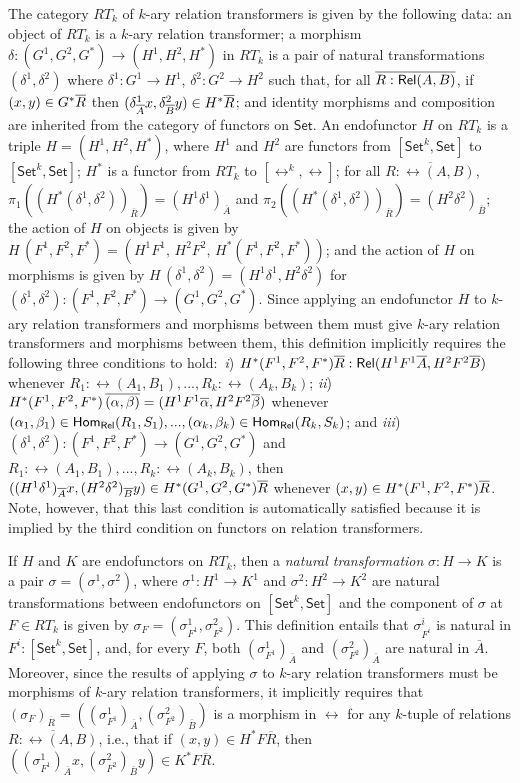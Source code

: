 \documentclass[runningheads]{llncs}
\newcommand{\set}{\mathsf{Set}}
\begin{document}
The category $RT_k$ of $k$-ary relation transformers is given by the
following data: an object of $RT_k$ is a $k$-ary relation transformer;
a morphism $\delta : (G^1,G^2,G^*) \to (H^1,H^2,H^*)$ in $RT_k$ is a
pair of natural transformations $(\delta^1, \delta^2)$ where $\delta^1
: G^1 \to H^1$, $\delta^2 : G^2 \to H^2$ such that, for all $\overline{R :
  \mathsf{Rel}(A, B)}$, if $(x, y) \in G^*\overline{R}$ then $(\delta^1_{\overline{A}}x,
\delta^2_{\overline{B}}y) \in H^*\overline{R}$; and identity morphisms and
composition are inherited from the category of functors on $\set$.  An
endofunctor $H$ on $RT_k$ is a triple $H = (H^1,H^2,H^*)$, where $H^1$
and $H^2$ are functors from $[\set^k,\set]$ to $[\set^k,\set]$; $H^*$
is a functor from $RT_k$ to $[\rel^k,\rel]$; for all $\overline{R :
  \rel(A,B)}$, $\pi_1((H^*(\delta^1,\delta^2))_{\overline{R}}) = (H^1
\delta^1)_{\overline{A}}$ and
$\pi_2((H^*(\delta^1,\delta^2))_{\overline{R}}) = (H^2
\delta^2)_{\overline{B}}$; the action of $H$ on objects is given by
$H\,(F^1,F^2,F^*) = (H^1F^1,\,H^2F^2,\,H^*(F^1,F^2,F^*))$; and the
action of $H$ on morphisms is given by $H\,(\delta^1,\delta^2) =
(H^1\delta^1,H^2\delta^2)$ for $(\delta^1,\delta^2) : (F^1,F^2,F^*)\to
(G^1,G^2,G^*)$.  Since applying an endofunctor $H$ to $k$-ary relation
transformers and morphisms between them must give $k$-ary relation
transformers and morphisms between them, this definition implicitly
requires the following three conditions to hold: \,{\em i})
$H^*(F^1,F^2,F^*) \overline{R} : \mathsf{Rel}(H^1F^1 \overline{A}, H^2F^2 \overline{B})$
whenever $R_1:\rel(A_1,B_1),...,R_k:\rel(A_k,B_k)$; {\em ii})
$H^*(F^1,F^2,F^*)\, \overline{(\alpha, \beta)} = (H^1F^1\overline{\alpha}, H^2F^2
\overline{\beta})$ whenever $(\alpha_1, \beta_1) \in \mathsf{Hom_{Rel}}(R_1,S_1),...,
(\alpha_k, \beta_k) \in \mathsf{Hom_{Rel}}(R_k,S_k)$; and {\em iii}) $(\delta^1,\delta^2) : 
(F^1,F^2,F^*)\to (G^1,G^2,G^*)$ and
$R_1:\rel(A_1,B_1),...,R_k:\rel(A_k,B_k)$, then
$((H^1\delta^1)_{\overline{A}}x, (H^2\delta^2)_{\overline{B}}y) \in
H^*(G^1,G^2,G^*)\overline{R}$ whenever $(x, y) \in
H^*(F^1,F^2,F^*)\overline{R}$. Note, however, that this last condition is
automatically satisfied because it is implied by the third condition
on functors on relation transformers.

If $H$ and $K$ are endofunctors on $RT_k$, then a {\em natural
  transformation} $\sigma : H \to K$ is a pair $\sigma = (\sigma^1,
\sigma^2)$, where $\sigma^1 : H^1 \to K^1$ and $\sigma^2 : H^2 \to
K^2$ are natural transformations between endofunctors on
$[\set^k,\set]$ and the component of $\sigma$ at $F \in RT_k$ is given
by $\sigma_F = (\sigma^1_{F^1}, \sigma^2_{F^2})$.  This definition
entails that $\sigma^i_{F^i}$ is natural in $F^i : [\set^k,\set]$,
and, for every $F$, both $(\sigma^1_{F^1})_{\overline{A}}$ and
$(\sigma^2_{F^2})_{\overline{A}}$ are natural in $\overline{A}$.
Moreover, since the results of applying $\sigma$ to $k$-ary relation
transformers must be morphisms of $k$-ary relation transformers, it
implicitly requires that $(\sigma_F)_{\overline{R}} = (
(\sigma^1_{F^1})_{\overline{A}}, (\sigma^2_{F^2})_{\overline{B}})$ is
a morphism in $\rel$ for any $k$-tuple of relations $\overline{R :
  \rel(A, B)}$, i.e., that if $(x, y) \in H^*F\overline{R}$, then
$((\sigma^1_{F^1})_{\overline{A}} x, (\sigma^2_{F^2})_{\overline{B}}
y) \in K^*F\overline{R}$.
\end{document}
